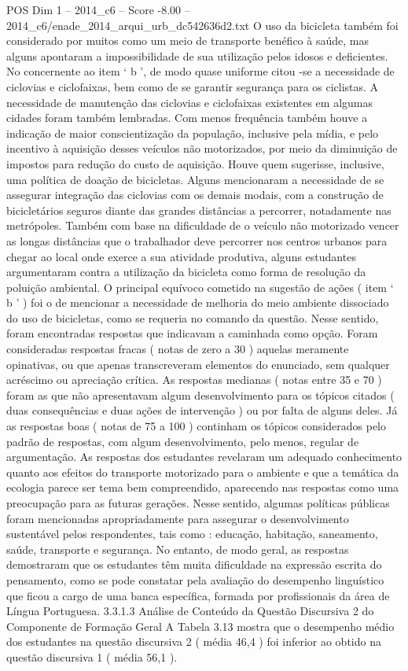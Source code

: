 \begin{textsample}{POS Dim 1 – 2014\_c6 – Score -8.00 – 2014\_c6/enade\_2014\_arqui\_urb\_dc542636d2.txt}
O uso da bicicleta também foi considerado por muitos como um meio de transporte benéfico à saúde, mas alguns apontaram a impossibilidade de sua utilização pelos idosos e deficientes.
No concernente ao item ‘ b ’, de modo quase uniforme citou -se a necessidade de ciclovias e ciclofaixas, bem como de se garantir segurança para os ciclistas.
A necessidade de manutenção das ciclovias e ciclofaixas existentes em algumas cidades foram também lembradas.
Com menos frequência também houve a indicação de maior conscientização da população, inclusive pela mídia, e pelo incentivo à aquisição desses veículos não motorizados, por meio da diminuição de impostos para redução do custo de aquisição.
Houve quem sugerisse, inclusive, uma política de doação de bicicletas.
Alguns mencionaram a necessidade de se assegurar integração das ciclovias com os demais modais, com a construção de bicicletários seguros diante das grandes distâncias a percorrer, notadamente nas metrópoles.
Também com base na dificuldade de o veículo não motorizado vencer as longas distâncias que o trabalhador deve percorrer nos centros urbanos para chegar ao local onde exerce a sua atividade produtiva, alguns estudantes argumentaram contra a utilização da bicicleta como forma de resolução da poluição ambiental.
O principal equívoco cometido na sugestão de ações ( item ‘ b ’ ) foi o de mencionar a necessidade de melhoria do meio ambiente dissociado do uso de bicicletas, como se requeria no comando da questão.
Nesse sentido, foram encontradas respostas que indicavam a caminhada como opção.
Foram consideradas respostas fracas ( notas de zero a 30 ) aquelas meramente opinativas, ou que apenas transcreveram elementos do enunciado, sem qualquer acréscimo ou apreciação crítica.
As respostas medianas ( notas entre 35 e 70 ) foram as que não apresentavam algum desenvolvimento para os tópicos citados ( duas consequências e duas ações de intervenção ) ou por falta de alguns deles.
Já as respostas boas ( notas de 75 a 100 ) continham os tópicos considerados pelo padrão de respostas, com algum desenvolvimento, pelo menos, regular de argumentação.
As respostas dos estudantes revelaram um adequado conhecimento quanto aos efeitos do transporte motorizado para o ambiente e que a temática da ecologia parece ser tema bem compreendido, aparecendo nas respostas como uma preocupação para as futuras gerações.
Nesse sentido, algumas políticas públicas foram mencionadas apropriadamente para assegurar o desenvolvimento sustentável pelos respondentes, tais como : educação, habitação, saneamento, saúde, transporte e segurança.
No entanto, de modo geral, as respostas demostraram que os estudantes têm muita dificuldade na expressão escrita do pensamento, como se pode constatar pela avaliação do desempenho linguístico que ficou a cargo de uma banca específica, formada por profissionais da área de Língua Portuguesa. 3.3.1.3 Análise de Conteúdo da Questão Discursiva 2 do Componente de Formação Geral A Tabela 3.13 mostra que o desempenho médio dos estudantes na questão discursiva 2 ( média 46,4 ) foi inferior ao obtido na questão discursiva 1 ( média 56,1 ).

\end{textsample}
